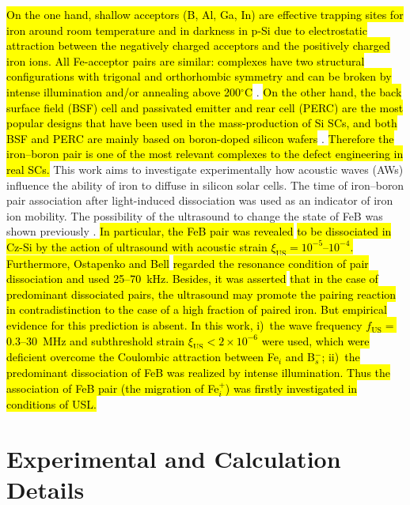 \documentclass[sn-mathphys]{sn-jnl}%
\theoremstyle{thmstyleone}%
\theoremstyle{thmstyletwo}%
\theoremstyle{thmstylethree}%
\begin{document}
\hl{ On the one hand, shallow acceptors (B, Al, Ga, In) are effective trapping sites for iron around room temperature
and in darkness in p-Si due to electrostatic attraction between the negatively charged
acceptors and the positively charged iron ions.
All Fe-acceptor pairs are similar:
complexes have two structural configurations
with trigonal and orthorhombic symmetry and can be broken by
intense illumination and/or annealing above 200$^\circ$C} \cite{Istratov1999,FeBKinAPL2013}.
\hl{ On the other hand, the back surface field (BSF) cell and passivated emitter and rear cell (PERC)
are the most popular designs that have been used in the mass-production of Si SCs,
and both BSF and PERC are mainly  based on boron-doped silicon wafers }\cite{SCRev2020,GreenRew2019}.
\hl{ Therefore the iron--boron pair is one of the most relevant complexes to the defect engineering in real SCs.}
This work aims to investigate experimentally how acoustic waves (AWs) influence the ability of iron to diffuse in silicon solar cells.
The time of iron--boron pair association after  light-induced dissociation was used as an indicator of iron ion mobility.
The possibility of the ultrasound to  change the state of FeB was shown previously  \cite{Ostapenko1994APL,Ostapenko1995}.
\hl{
In particular, the
FeB pair was revealed} \cite{Ostapenko1995}
\hl{ to be dissociated in Cz-Si by the action of ultrasound with acoustic strain $\xi_\mathrm{US}=10^{-5}$--$10^{-4}$.
Furthermore, Ostapenko and Bell} \cite{Ostapenko1995} \hl{regarded the resonance condition of pair dissociation and used 25--70~kHz.
Besides, it was asserted} \cite{Ostapenko1994APL} \hl{that in the case of
predominant dissociated pairs, the ultrasound may promote the pairing reaction in contradistinction to the case of a
high fraction of paired iron.
But  empirical evidence  for this prediction  is absent.
In this work,
i)~the wave frequency $f_\mathrm{US}=$0.3--30~MHz and subthreshold strain $\xi_\mathrm{US}<2\times10^{-6}$ were used, which were deficient overcome the Coulombic attraction between Fe$_i$ and B$_s^-$;
ii)~the predominant  dissociation of FeB was realized by intense illumination.
Thus the association of FeB pair (the migration  of Fe$_i^+$) was firstly investigated in conditions of USL.}


\section{Experimental and Calculation Details}
\label{sec:1}
\end{document}
